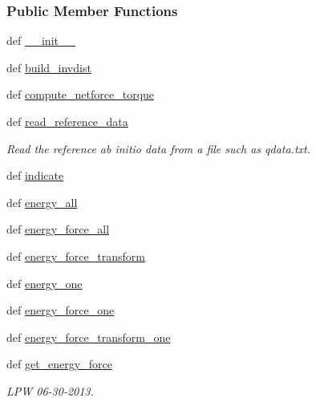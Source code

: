\subsubsection*{Public Member Functions}
\begin{DoxyCompactItemize}
\item 
def \hyperlink{classforcebalance_1_1openmmio_1_1AbInitio__OpenMM_af5fcee0c4321c7d3024868742a266f7a}{\-\_\-\-\_\-init\-\_\-\-\_\-}
\item 
def \hyperlink{classforcebalance_1_1abinitio_1_1AbInitio_a7475857193eefd4edd020d4f2a8fec17}{build\-\_\-invdist}
\item 
def \hyperlink{classforcebalance_1_1abinitio_1_1AbInitio_afbf86c26158a68cae7460b4106809fdd}{compute\-\_\-netforce\-\_\-torque}
\item 
def \hyperlink{classforcebalance_1_1abinitio_1_1AbInitio_aa73bedbf1e2cf19f2fa1e88815f1bd86}{read\-\_\-reference\-\_\-data}
\begin{DoxyCompactList}\small\item\em Read the reference ab initio data from a file such as qdata.\-txt. \end{DoxyCompactList}\item 
def \hyperlink{classforcebalance_1_1abinitio_1_1AbInitio_a3260db78e8c174f04a64661c4e5c181c}{indicate}
\item 
def \hyperlink{classforcebalance_1_1abinitio_1_1AbInitio_a99cca2d0bcbb382fcf7069907e74639f}{energy\-\_\-all}
\item 
def \hyperlink{classforcebalance_1_1abinitio_1_1AbInitio_acffb00d0edc291791eafb8a2d63ab3a1}{energy\-\_\-force\-\_\-all}
\item 
def \hyperlink{classforcebalance_1_1abinitio_1_1AbInitio_afdcc0b598565afa1b1456f78f87cc1be}{energy\-\_\-force\-\_\-transform}
\item 
def \hyperlink{classforcebalance_1_1abinitio_1_1AbInitio_aa91a79773331fdf845ab34e54ce99d47}{energy\-\_\-one}
\item 
def \hyperlink{classforcebalance_1_1abinitio_1_1AbInitio_a157be30ae6d556e17d8af30cefe393f4}{energy\-\_\-force\-\_\-one}
\item 
def \hyperlink{classforcebalance_1_1abinitio_1_1AbInitio_a961c909cf811a710095b091917c57d95}{energy\-\_\-force\-\_\-transform\-\_\-one}
\item 
def \hyperlink{classforcebalance_1_1abinitio_1_1AbInitio_ace85b4ad9266a96d16e39a4c6b440b7f}{get\-\_\-energy\-\_\-force}
\begin{DoxyCompactList}\small\item\em L\-P\-W 06-\/30-\/2013. \end{DoxyCompactList}\item 

\end{DoxyCompactItemize}

